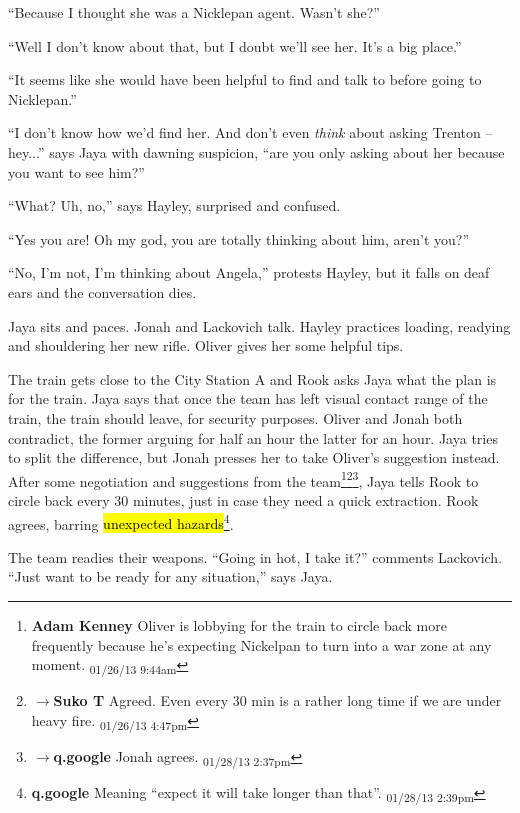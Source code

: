 ``Because I thought she was a Nicklepan agent.  Wasn't she?''

``Well I don't know about that, but I doubt we'll see her.  It's a big place.''

``It seems like she would have been helpful to find and talk to before going to Nicklepan.''

``I don't know how we'd find her.  And don't even \textit{think} about asking Trenton -- hey...'' says Jaya with dawning suspicion, ``are you only asking about her because you want to see him?''

``What?  Uh, no,'' says Hayley, surprised and confused.

``Yes you are!  Oh my god, you are totally thinking about him, aren't you?''

``No, I'm not, I'm thinking about Angela,'' protests Hayley, but it falls on deaf ears and the conversation dies.



Jaya sits and paces.  Jonah and Lackovich talk.  Hayley practices loading, readying and shouldering her new rifle.  Oliver gives her some helpful tips.



The train gets close to the City Station A and Rook asks Jaya what the plan is for the train.  Jaya says that once the team has left visual contact range of the train, the train should leave, for security purposes.  Oliver and Jonah both contradict, the former arguing for half an hour the latter for an hour.  Jaya tries to split the difference, but Jonah presses her to take Oliver's suggestion instead.  After some negotiation and suggestions from the team\footnote{\textbf{Adam Kenney }Oliver is lobbying for the train to circle back more frequently because he's expecting Nickelpan to turn into a war zone at any moment. \textsubscript{01/26/13 9:44am}}\footnote{$\rightarrow$\textbf{Suko T }Agreed.  Even every 30 min is a rather long time if we are under heavy fire. \textsubscript{01/26/13 4:47pm}}\footnote{$\rightarrow$\textbf{q.google }Jonah agrees. \textsubscript{01/28/13 2:37pm}}, Jaya tells Rook to circle back every 30 minutes, just in case they need a quick extraction.  Rook agrees, barring \hl{unexpected hazards}\footnote{\textbf{q.google }Meaning ``expect it will take longer than that''. \textsubscript{01/28/13 2:39pm}}.



The team readies their weapons.  ``Going in hot, I take it?'' comments Lackovich.  ``Just want to be ready for any situation,'' says Jaya.



